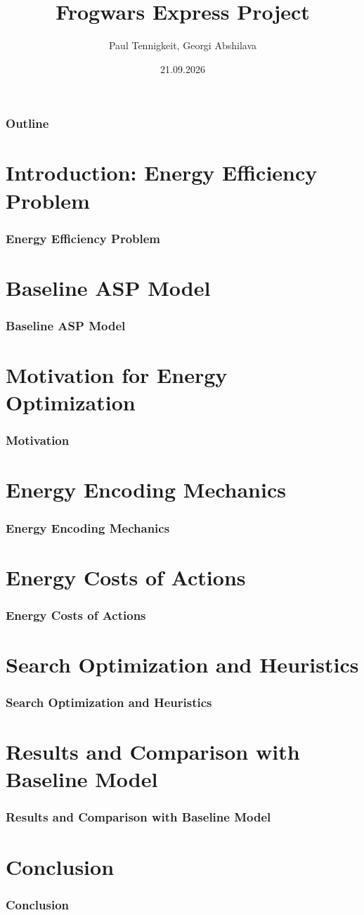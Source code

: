 \documentclass{beamer}
\title{Frogwars Express Project}
\author{Paul Tennigkeit, Georgi Abshilava}
\institute{Universität Potsdam}
\date{21.09.2026}
\begin{document}
\frame{\titlepage}

\begin{frame}
\frametitle{Outline}
\tableofcontents
\end{frame}

\section{Introduction: Energy Efficiency Problem}
\begin{frame}
\frametitle{Energy Efficiency Problem}

\end{frame}

\section{Baseline ASP Model}
\begin{frame}
\frametitle{Baseline ASP Model}

\end{frame}

\section{Motivation for Energy Optimization}
\begin{frame}
\frametitle{Motivation}

\end{frame}

\section{Energy Encoding Mechanics}
\begin{frame}
\frametitle{Energy Encoding Mechanics}

\end{frame}

\section{Energy Costs of Actions}
\begin{frame}
\frametitle{Energy Costs of Actions}

\end{frame}

\section{Search Optimization and Heuristics}
\begin{frame}
\frametitle{Search Optimization and Heuristics}

\end{frame}

\section{Results and Comparison with Baseline Model}
\begin{frame}
\frametitle{Results and Comparison with Baseline Model}

\end{frame}

\section{Conclusion}
\begin{frame}
\frametitle{Conclusion}

\end{frame}
\end{document}
